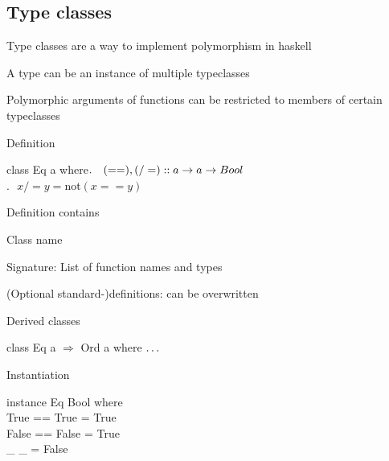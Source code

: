 \subsection{Type classes}
\enumstart
	\item Type classes are a way to implement polymorphism in haskell
	\item A type can be an instance of multiple typeclasses
	\item Polymorphic arguments of functions can be restricted to members of certain typeclasses
	\item Definition
	\enumstart
		\item class Eq a where$\\. \ \ \ (==), (/=) :: a \rightarrow a \rightarrow Bool$\\$. \ \ \ x /= y = $not$(x==y)$
		\item Definition contains
		\enumstart
			\item Class name
			\item Signature: List of function names and types
			\item (Optional standard-)definitions: can be overwritten
		\enumend
	\enumend
	\item Derived classes
	\enumstart
		\item class Eq a $\Rightarrow$ Ord a where $\mathellipsis$
	\enumend
	\item Instantiation
	\enumstart
		\item instance Eq Bool where\\True == True = True\\False == False = True\\ \_ \_ = False
	\enumend
\enumend
